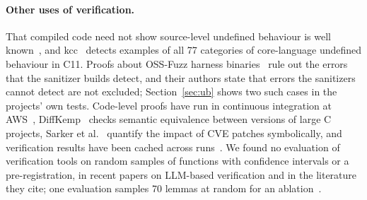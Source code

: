 \paragraph{Other uses of verification.} That compiled code need not show source-level undefined behaviour is well
known~\cite{wang2012ub,stack2013}, and kcc~\cite{kcc} detects examples of all 77 categories of core-language undefined
behaviour in C11. Proofs about OSS-Fuzz harness binaries~\cite{theoremossverify} rule out the errors that the sanitizer
builds detect, and their authors state that errors the sanitizers cannot detect are not excluded;
Section~\ref{sec:ub} shows two such cases in the projects' own tests. Code-level proofs have run in continuous
integration at AWS~\cite{s2n2018,chong2020}, DiffKemp~\cite{diffkemp} checks semantic equivalence between versions of
large C projects, Sarker et al.~\cite{sarker2026} quantify the impact of CVE patches symbolically, and verification
results have been cached across runs~\cite{leinowustholz,infer}. We found no evaluation of verification tools on random
samples of functions with confidence intervals or a pre-registration, in recent papers on LLM-based verification and in
the literature they cite; one evaluation samples 70 lemmas at random for an ablation~\cite{autorocq}.
